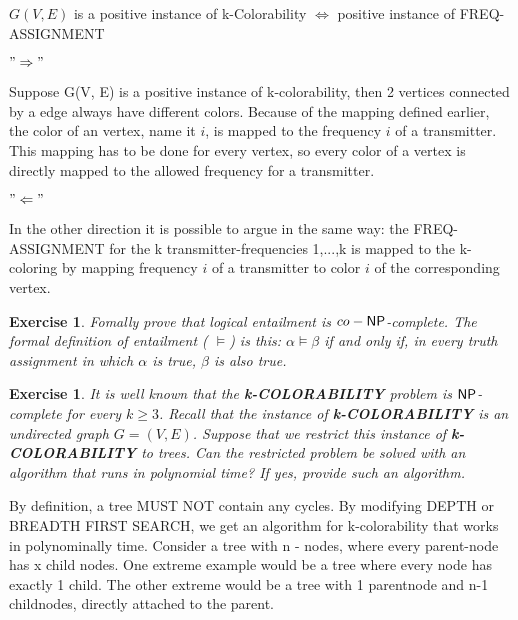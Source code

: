 \documentclass [11pt]{article}
\newtheorem{exercise}[theorem]{Exercise}
\newcommand{\ccfont}[1]{\protect\mathsf{#1}}
\newcommand{\NP}{\ccfont{NP}}
\newcommand{\solution}[1]{\noindent {\bf Solution.}  #1}
\begin{document}
\medskip

 $G(V, E)$ is a positive instance of k-Colorability $\Leftrightarrow$ positive instance of FREQ-ASSIGNMENT

$ "\Rightarrow" $

Suppose G(V, E) is a positive instance of k-colorability, then 2 vertices connected by a edge always have different colors. Because of the mapping defined earlier, the color of an vertex, name it $i$, is mapped to the frequency $i$ of a transmitter. This mapping has to be done for every vertex, so every color of a vertex is directly mapped to the allowed frequency for a transmitter.

\medskip

$ "\Leftarrow" $

In the other direction it is possible to argue in the same way: the FREQ-ASSIGNMENT for the k transmitter-frequencies {1,...,k} is mapped to the k-coloring by mapping frequency $i$ of a transmitter to color $i$ of the corresponding vertex.

\begin{exercise}
  \label{ex:CO-NP}
  Fomally prove that logical entailment is $co-\NP$-complete. The formal definition of entailment ( $\models$) is this: $\alpha \models \beta$ if and only if, in every truth assignment in which $\alpha$ is true, $\beta$ is also true.  
\end{exercise}





\begin{exercise}
  \label{ex:Colors}
  It is well known that the \textbf{k-COLORABILITY} problem is $\NP$-complete for every $k \geq 3$. Recall that the instance of \textbf{k-COLORABILITY} is an undirected graph $G = (V, E)$. Suppose that we restrict this instance of \textbf{k-COLORABILITY} to trees. Can the restricted problem be solved with an algorithm that runs in polynomial time? If yes, provide such an algorithm. 
\end{exercise}


\solution

By definition, a tree MUST NOT contain any cycles. By modifying DEPTH or BREADTH FIRST SEARCH, we get an algorithm for k-colorability that works in polynominally time. Consider a tree with n - nodes, where every parent-node has x child nodes. One extreme example would be a tree where every node has exactly 1 child. The other extreme would be a tree with 1 parentnode and n-1 childnodes, directly attached to the parent.
\end{document}
